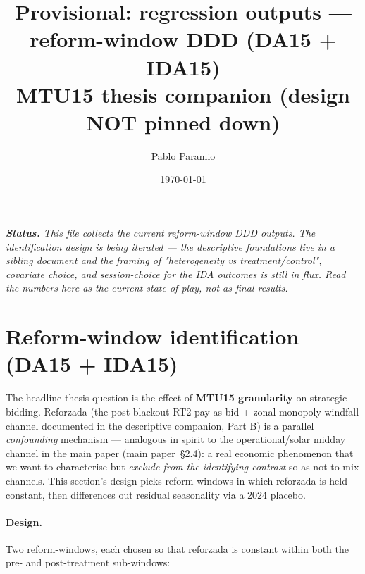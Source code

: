 \documentclass[11pt,a4paper]{article}
\title{Provisional: regression outputs --- reform-window DDD (DA15 + IDA15)\\[3pt]\large MTU15 thesis companion (design NOT pinned down)}
\author{Pablo Paramio}
\date{\today}
\begin{document}
\maketitle

\noindent\emph{\textbf{Status.} This file collects the current reform-window DDD outputs. The identification design is being iterated --- the descriptive foundations live in a sibling document and the framing of "heterogeneity vs treatment/control", covariate choice, and session-choice for the IDA outcomes is still in flux. Read the numbers here as the current state of play, not as final results.}

\tableofcontents

\bigskip

\section{Reform-window identification (DA15 + IDA15)}\label{sec:prov:reform_window_ddd}

\noindent The headline thesis question is the effect of \textbf{MTU15 granularity} on strategic bidding. Reforzada (the post-blackout RT2 pay-as-bid + zonal-monopoly windfall channel documented in the descriptive companion, Part B) is a parallel \emph{confounding} mechanism --- analogous in spirit to the operational/solar midday channel in the main paper (main paper~\S2.4): a real economic phenomenon that we want to characterise but \emph{exclude from the identifying contrast} so as not to mix channels. This section's design picks reform windows in which reforzada is held constant, then differences out residual seasonality via a 2024 placebo.

\paragraph{Design.} Two reform-windows, each chosen so that reforzada is constant within both the pre- and post-treatment sub-windows:
\end{document}
